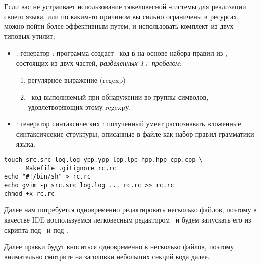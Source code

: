 \secdown

Если вас не устраивает использование тяжеловесной \racket-системы для реализации
своего языка, или по каким-то причином вы сильно ограничены в
ресурсах, можно пойти более эффективным путем, и использовать комплект
из двух типовых утилит:
\begin{itemize}
  \item \flex: генератор : программа создает
\cpp\ код в  на основе набора правил из , состоящих
из двух частей, \emph{разделенных 1+ пробелом}:
\begin{enumerate}
  \item регулярное выражение (regexp)
  \item \cpp\ код выполняемый при обнаружении во  группы
  символов, удовлетворяющих этому regexpу.
\end{enumerate}

\item \bison: генератор синтаксических : полученный
 умеет распознавать вложенные синтаксичсекие структуры,
описанные в файле  как набор правил грамматики языка.
\end{itemize}


\begin{verbatim}
touch src.src log.log ypp.ypp lpp.lpp hpp.hpp cpp.cpp \
      Makefile .gitignore rc.rc
echo "#!/bin/sh" > rc.rc
echo gvim -p src.src log.log ... rc.rc >> rc.rc
chmod +x rc.rc
\end{verbatim}

Далее нам потребуется одновременно редактировать несколько файлов, поэтому в
качестве IDE воспользуемся легковесным редактором \gvim{}\ и будем запускать его из
скрипта \file{rc.rc} под \linux\ и \file{bat.bat} под \win.

\clearpage
{}

Далее правки будут вноситься одновременно в несколько файлов, поэтому
внимательно смотрите на заголовки небольших секций кода далее.

\clearpage
{}
\clearpage




\secup